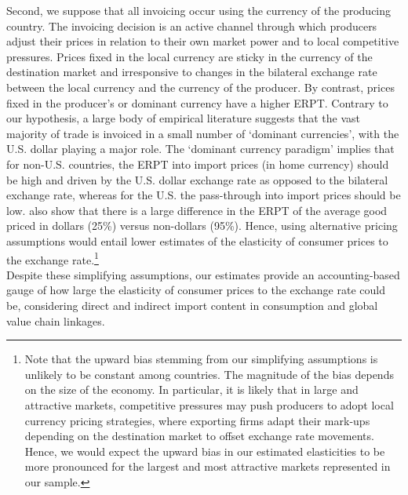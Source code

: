\documentclass[11pt,a4paper]{paper} %
\begin{document}
Second, we suppose that all invoicing occur using the currency of the producing country. The invoicing decision is an active channel through which producers adjust their prices in relation to their own market power and to local competitive pressures. Prices fixed in the local currency are sticky in the currency of the destination market and irresponsive to changes in the bilateral exchange rate between the local currency and the currency of the producer. By contrast, prices fixed in the producer's or dominant currency have a higher ERPT. Contrary to our hypothesis, a large body of empirical literature suggests that the vast majority of trade is invoiced in a small number of ‘dominant currencies’, with the U.S. dollar playing a major role. The ‘dominant currency paradigm’ \citep{Gopinath2020} implies that for non-U.S. countries, the ERPT into import prices (in home currency) should be high and driven by the U.S. dollar exchange rate as opposed to the bilateral exchange rate, whereas for the U.S. the pass-through into import prices should be low. \cite{Gopinath2010} also show that there is a large difference in the ERPT of the average good priced in dollars (25\%) versus non-dollars (95\%).
Hence, using alternative pricing assumptions would entail lower estimates of the elasticity of consumer prices to the exchange rate.\footnote{Note that the upward bias stemming from our simplifying assumptions is unlikely to be constant among countries.
The magnitude of the bias depends on the size of the economy.
In particular, it is likely that in large and attractive markets, competitive pressures may push producers to adopt local currency pricing strategies, where exporting firms adapt their mark-ups depending on the destination market to offset exchange rate movements.
Hence, we would expect the upward bias in our estimated elasticities to be more pronounced for the largest and most attractive markets represented in our sample.} \\
Despite these simplifying assumptions, our estimates provide an accounting-based gauge of how large the elasticity of consumer prices to the exchange rate could be, considering direct and indirect import content in consumption and global value chain linkages. 
\end{document}
